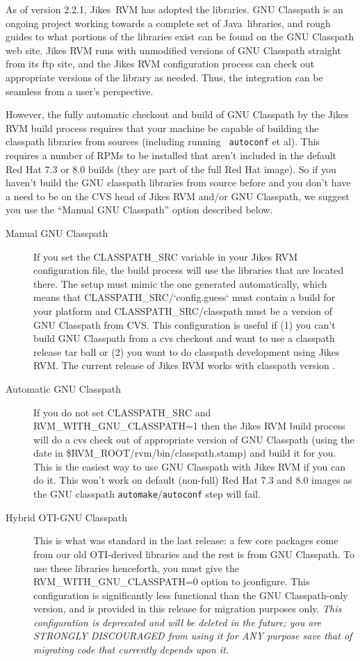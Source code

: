  As of version 2.2.1, Jikes\JikesTMFootnote\ RVM has adopted the
 libraries.  GNU
Classpath is an ongoing project working towards a complete set of
Java\JavaTMFootnote\ libraries, and rough guides to what portions of
the libraries exist can be found on the GNU Classpath web site.  Jikes
RVM runs with unmodified versions of GNU Classpath straight from its
ftp site, and the Jikes RVM configuration process can check out
appropriate versions of the library as needed.  Thus, the integration
can be seamless from a user's perspective.

However, the fully automatic checkout and build of GNU Classpath by
the Jikes RVM build process requires that your machine be capable of
building the classpath libraries from sources (including running {\tt
autoconf} et al).  This requires a number of RPMs to be installed that
aren't included in the default Red Hat 7.3 or 8.0 builds (they are
part of the full Red Hat image).  So if you haven't build the GNU
classpath libraries from source before and you don't have a need to be
on the CVS head of Jikes RVM and/or GNU Classpath, we suggest you use
the ``Manual GNU Classpath'' option described below.

\begin{description}
\item[Manual GNU Classpath] If you set the CLASSPATH\_SRC variable in
your Jikes RVM configuration file, the build process will use the
libraries that are located there.  The setup must mimic the one
generated automatically, which means that
CLASSPATH\_SRC/`config.guess` must contain a build for your platform
and CLASSPATH\_SRC/classpath must be a version of GNU Classpath from
CVS.  This configuration is useful if (1) you can't build GNU
Classpath from a cvs checkout and want to use a classpath release tar
ball or (2) you want to do classpath development using Jikes RVM. The
current release of Jikes RVM works with classpath version \classpathversion.

\item[Automatic GNU Classpath] If you do not set CLASSPATH\_SRC and 
RVM\_WITH\_GNU\_CLASSPATH=1 then the Jikes RVM build process will do a
cvs check out of appropriate version of GNU Classpath (using the date
in \$RVM\_ROOT/rvm/bin/classpath.stamp) and build it for you.  This is
the easiest way to use GNU Classpath with Jikes RVM if you can do it.
This won't work on default (non-full) Red Hat 7.3 and 8.0 images
as the GNU classpath {\tt automake}/{\tt autoconf} step will fail.

\item[Hybrid OTI-GNU Classpath] This is what was standard in
the last release: a few core packages come from our old OTI-derived
libraries and the rest is from GNU Classpath.  To use these libraries
henceforth, you must give the RVM\_WITH\_GNU\_CLASSPATH=0 option to
jconfigure.  This configuration is significantly less functional than
the GNU Classpath-only version, and is provided in this release for
migration purposes only.  {\em This configuration is deprecated and
will be deleted in the future; you are STRONGLY DISCOURAGED from using
it for ANY purpose save that of migrating code that currently depends
upon it.}
\end{description}

